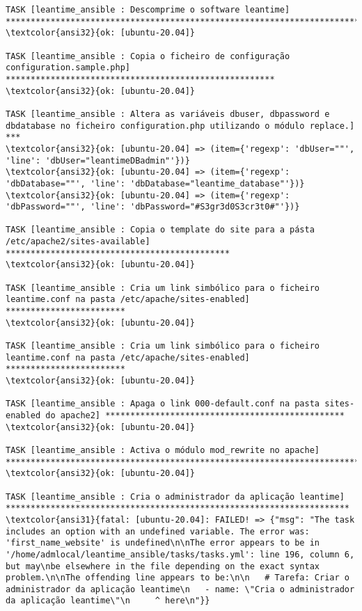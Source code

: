 \documentclass{scrartcl}
\begin{document}
\begin{Verbatim}
TASK [leantime_ansible : Descomprime o software leantime] ********************************************************************************
\textcolor{ansi32}{ok: [ubuntu-20.04]}

TASK [leantime_ansible : Copia o ficheiro de configuração configuration.sample.php] ******************************************************
\textcolor{ansi32}{ok: [ubuntu-20.04]}

TASK [leantime_ansible : Altera as variáveis dbuser, dbpassword e dbdatabase no ficheiro configuration.php utilizando o módulo replace.] ***
\textcolor{ansi32}{ok: [ubuntu-20.04] => (item={'regexp': 'dbUser=""', 'line': 'dbUser="leantimeDBadmin"'})}
\textcolor{ansi32}{ok: [ubuntu-20.04] => (item={'regexp': 'dbDatabase=""', 'line': 'dbDatabase="leantime_database"'})}
\textcolor{ansi32}{ok: [ubuntu-20.04] => (item={'regexp': 'dbPassword=""', 'line': 'dbPassword="#S3gr3d0S3cr3t0#"'})}

TASK [leantime_ansible : Copia o template do site para a pásta /etc/apache2/sites-available] *********************************************
\textcolor{ansi32}{ok: [ubuntu-20.04]}

TASK [leantime_ansible : Cria um link simbólico para o ficheiro leantime.conf na pasta /etc/apache/sites-enabled] ************************
\textcolor{ansi32}{ok: [ubuntu-20.04]}

TASK [leantime_ansible : Cria um link simbólico para o ficheiro leantime.conf na pasta /etc/apache/sites-enabled] ************************
\textcolor{ansi32}{ok: [ubuntu-20.04]}

TASK [leantime_ansible : Apaga o link 000-default.conf na pasta sites-enabled do apache2] ************************************************
\textcolor{ansi32}{ok: [ubuntu-20.04]}

TASK [leantime_ansible : Activa o módulo mod_rewrite no apache] **************************************************************************
\textcolor{ansi32}{ok: [ubuntu-20.04]}

TASK [leantime_ansible : Cria o administrador da aplicação leantime] *********************************************************************
\textcolor{ansi31}{fatal: [ubuntu-20.04]: FAILED! => {"msg": "The task includes an option with an undefined variable. The error was: 'first_name_website' is undefined\n\nThe error appears to be in '/home/admlocal/leantime_ansible/tasks/tasks.yml': line 196, column 6, but may\nbe elsewhere in the file depending on the exact syntax problem.\n\nThe offending line appears to be:\n\n   # Tarefa: Criar o administrador da aplicação leantime\n   - name: \"Cria o administrador da aplicação leantime\"\n     ^ here\n"}}


\end{Verbatim}
\end{document}
